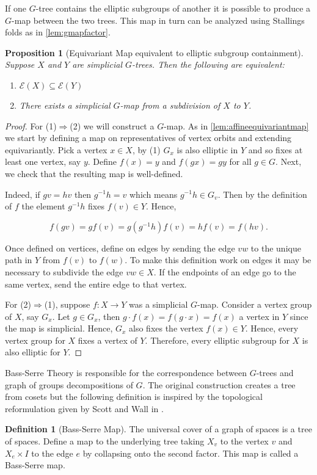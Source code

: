 \documentclass[12pt,parskip=full]{report}
\theoremstyle{plain}
\newtheorem{prop}[thm]{Proposition}
\theoremstyle{definition}
\newtheorem{dfn}[thm]{Definition}
\begin{document}
If one \(G\)-tree contains the elliptic subgroups of another it is possible to produce a \(G\)-map between the two trees. This map in turn can be analyzed using Stallings folds as in \ref{lem:gmapfactor}.
\begin{prop}
[Equivariant Map equivalent to elliptic subgroup containment]
\label{pro:gmapfromsubset}
Suppose $X$ and $Y$ are simplicial \(G\)-trees. Then the following are equivalent:
\begin{enumerate}
    \item \(\mathcal{E}(X) \subseteq \mathcal{E}(Y)\)
    \item There exists a simplicial $G$-map from a subdivision of $X$ to $Y$.
\end{enumerate}
\end{prop}
\begin{proof}
    For (1)$\Rightarrow$(2) we will construct a $G$-map. As in \ref{lem:affineequivariantmap} we start by defining a map on representatives of vertex orbits and extending equivariantly. Pick a vertex \(x\in X\), by (1) \(G_x\) is also elliptic in \(Y\) and so fixes at least one vertex, say \(y\). Define \(f(x)=y\) and \(f(gx) = gy\) for all \(g\in G\). Next, we check that the resulting map is well-defined.
    
    Indeed, if \(gv = hv\) then \(g^{-1}h = v\) which means \(g^{-1}h \in G_v\). Then by the definition of \(f\) the element \(g^{-1}h\) fixes \(f(v)\in Y\). Hence,
    
    \[f(gv) = gf(v) = g(g^{-1}h)f(v) = hf(v) = f(hv).\]
    
    Once defined on vertices, define on edges by sending the edge \(vw\) to the unique path in \(Y\) from \(f(v)\) to \(f(w)\). To make this definition work on edges it may be necessary to subdivide the edge \(vw \in X\). If the endpoints of an edge go to the same vertex, send the entire edge to that vertex. 
    
    For (2)$\Rightarrow$(1), suppose $f:X\to Y$ was a simplicial $G$-map. Consider a vertex group of $X$, say $G_x$. Let $g\in G_x$, then $g\cdot f(x)=f(g\cdot x)=f(x)$ a vertex in $Y$ since the map is simplicial. Hence, $G_x$ also fixes the vertex $f(x)\in Y$. Hence, every vertex group for $X$ fixes a vertex of $Y$. Therefore, every elliptic subgroup for $X$ is also elliptic for $Y$.
\end{proof}

Bass-Serre Theory is responsible for the correspondence between \(G\)-trees and graph of groups decompositions of \(G\). The original construction creates a tree from cosets but the following definition is inspired by the topological reformulation given by Scott and Wall in \cite{scottwall}.
\begin{dfn}
    [Bass-Serre Map]
    \label{defn:bsmap}
    The universal cover of a graph of spaces is a tree of spaces. Define a map to the underlying tree taking $X_v$ to the vertex \(v\) and $X_e \times I$ to the edge \(e\) by collapsing onto the second factor. This map is called a Bass-Serre map.
\end{dfn}
\end{document}
